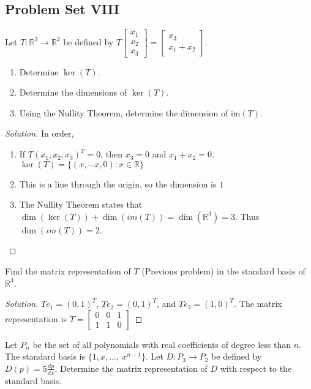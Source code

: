 \documentclass[crop=false,class=book]{standalone}
\begin{document}
\subsection{Problem Set VIII}
\begin{problem}
Let $T:\mathbb{R}^3\rightarrow \mathbb{R}^2$ be defined by $T\begin{bmatrix} x_1 \\ x_2 \\ x_3 \end{bmatrix} = \begin{bmatrix} x_3 \\ x_1+x_2 \end{bmatrix}$.
\begin{enumerate}
    \item Determine $\ker(T)$.
    \item Determine the dimensions of $\ker(T)$.
    \item Using the Nullity Theorem, determine the dimension of im$(T)$.
\end{enumerate}
\end{problem}
\begin{proof}[Solution]
In order,
\begin{enumerate}
    \item If $T(x_{1},x_{2},x_{3})^{T} = 0$, then $x_3=0$ and $x_{1}+x_{2}=0$. $\ker(T)=\{(x,-x,0):x\in \mathbb{R}\}$
    \item This is a line through the origin, so the dimension is $1$ 
    \item The Nullity Theorem states that $\dim(\ker(T))+\dim(im(T)) = \dim(\mathbb{R}^3) = 3$. Thus $\dim(im(T)) = 2$.
\end{enumerate}
\end{proof}
\begin{problem}
Find the matrix representation of $T$ (Previous problem) in the standard basis of $\mathbb{R}^3$.
\end{problem}
\begin{proof}[Solution]
$Te_1 = (0,1)^T$, $T e_2 = (0,1)^T$, and $Te_3 = (1,0)^T$. The matrix representation is $T=\begin{bmatrix} 0 & 0 & 1 \\ 1 & 1 & 0 \end{bmatrix}$
\end{proof}
\begin{problem}
Let $P_n$ be the set of all polynomials with real coefficients of degree less than $n$. The standard basis is $\{1,x,\hdots, \ x^{n-1}\}$. Let $D:P_3 \rightarrow P_2$ be defined by $D(p) = 5\frac{dp}{dx}$. Determine the matrix representation of $D$ with respect to the standard basis.
\end{problem}
\end{document}
